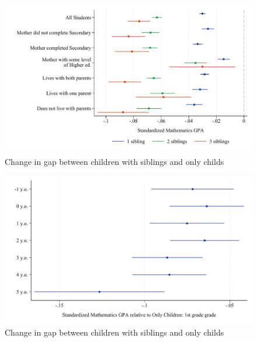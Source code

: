 \begin{figure}[htbp]
    \centering
    
        \includegraphics[width=\textwidth]{./FIGURES/TWFE/covid_twfe_D_bysibs_elm_all_gpa_m_adj_Tsiblings_Soldest_4.pdf}
        \caption{Change in gap between children with siblings and only childs}
        \label{fig:fig_appD}

\end{figure}

\begin{figure}[htbp]
    \centering
        \includegraphics[width=\textwidth]{./FIGURES/TWFE/twfe_age_youngest_g1_gpa_m_adj_Tsiblings_2_Soldest_4.pdf}
        \caption{Change in gap between children with siblings and only childs}
        \label{fig:fig_by_age_oldest}

\end{figure}

